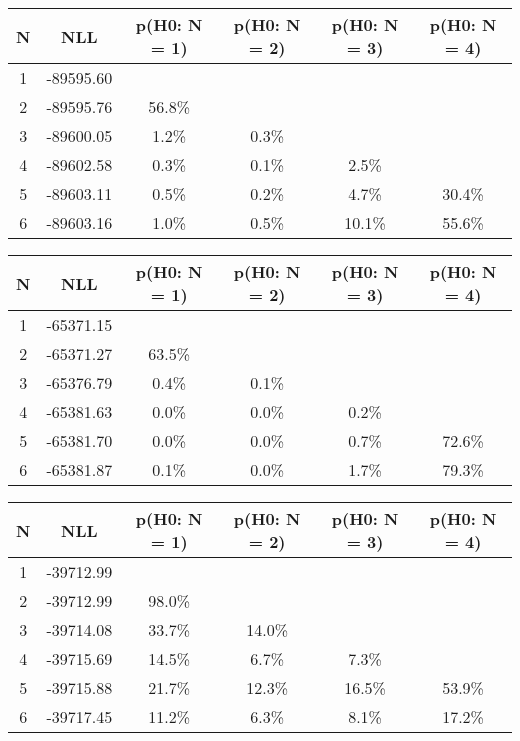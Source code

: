\begin{table}[htb]
	\begin{center}
{\footnotesize\renewcommand{\arraystretch}{1.4}
		\begin{tabular}{cc||cccc}
			N & NLL & p(H0: N = 1) & p(H0: N = 2) & p(H0: N = 3) & p(H0: N = 4)\\ 
		\hline
1 & -89595.60 & & & & \\
2 & -89595.76 & 56.8\% & & & \\
3 & -89600.05 & 1.2\% & 0.3\% & & \\
4 & -89602.58 & 0.3\% & 0.1\% & 2.5\% & \\
5 & -89603.11 & 0.5\% & 0.2\% & 4.7\% & 30.4\% \\
6 & -89603.16 & 1.0\% & 0.5\% & 10.1\% & 55.6\% \\
	\end{tabular}
		\label{tab:lab}
	}
	\end{center}\end{table}

\begin{table}[htb]
	\begin{center}
{\footnotesize\renewcommand{\arraystretch}{1.4}
		\begin{tabular}{cc||cccc}
			N & NLL & p(H0: N = 1) & p(H0: N = 2) & p(H0: N = 3) & p(H0: N = 4)\\ 
		\hline
1 & -65371.15 & & & & \\
2 & -65371.27 & 63.5\% & & & \\
3 & -65376.79 & 0.4\% & 0.1\% & & \\
4 & -65381.63 & 0.0\% & 0.0\% & 0.2\% & \\
5 & -65381.70 & 0.0\% & 0.0\% & 0.7\% & 72.6\% \\
6 & -65381.87 & 0.1\% & 0.0\% & 1.7\% & 79.3\% \\
	\end{tabular}
		\label{tab:lab}
	}
	\end{center}\end{table}

\begin{table}[htb]
	\begin{center}
{\footnotesize\renewcommand{\arraystretch}{1.4}
		\begin{tabular}{cc||cccc}
			N & NLL & p(H0: N = 1) & p(H0: N = 2) & p(H0: N = 3) & p(H0: N = 4)\\ 
		\hline
1 & -39712.99 & & & & \\
2 & -39712.99 & 98.0\% & & & \\
3 & -39714.08 & 33.7\% & 14.0\% & & \\
4 & -39715.69 & 14.5\% & 6.7\% & 7.3\% & \\
5 & -39715.88 & 21.7\% & 12.3\% & 16.5\% & 53.9\% \\
6 & -39717.45 & 11.2\% & 6.3\% & 8.1\% & 17.2\% \\
	\end{tabular}
		\label{tab:lab}
	}
	\end{center}\end{table}

